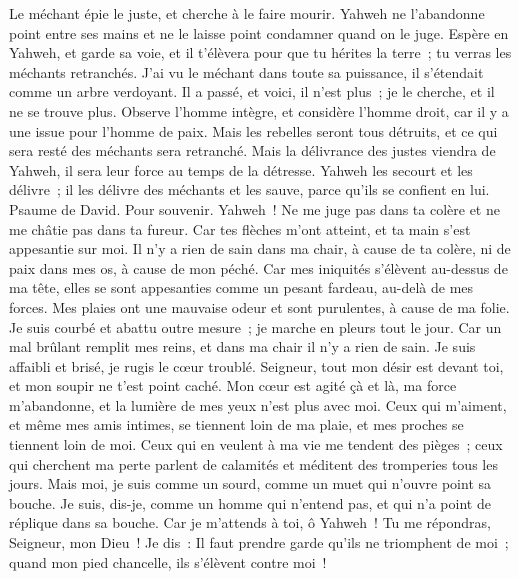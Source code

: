 \begin{multicols}{2}
 Le méchant épie le juste, et cherche à le faire mourir.
Yahweh ne l'abandonne point entre ses mains et ne le laisse point condamner quand on le juge.
 Espère en Yahweh, et garde sa voie, et il t'élèvera pour que tu hérites la terre~; tu verras les méchants retranchés.
 J'ai vu le méchant dans toute sa puissance, il s'étendait comme un arbre verdoyant.
Il a passé, et voici, il n'est plus~; je le cherche, et il ne se trouve plus.
 Observe l'homme intègre, et considère l'homme droit, car il y a une issue pour l'homme de paix.
Mais les rebelles seront tous détruits, et ce qui sera resté des méchants sera retranché.
 Mais la délivrance des justes viendra de Yahweh, il sera leur force au temps de la détresse.
Yahweh les secourt et les délivre~; il les délivre des méchants et les sauve, parce qu'ils se confient en lui.
\VerseOne{}Psaume de David. Pour souvenir.
Yahweh~! Ne me juge pas dans ta colère et ne me châtie pas dans ta fureur.
Car tes flèches m'ont atteint, et ta main s'est appesantie sur moi.
Il n'y a rien de sain dans ma chair, à cause de ta colère, ni de paix dans mes os, à cause de mon péché.
Car mes iniquités s'élèvent au-dessus de ma tête, elles se sont appesanties comme un pesant fardeau, au-delà de mes forces.
Mes plaies ont une mauvaise odeur et sont purulentes, à cause de ma folie.
Je suis courbé et abattu outre mesure~; je marche en pleurs tout le jour.
Car un mal brûlant remplit mes reins, et dans ma chair il n'y a rien de sain.
Je suis affaibli et brisé, je rugis le cœur troublé.
Seigneur, tout mon désir est devant toi, et mon soupir ne t'est point caché.
Mon cœur est agité çà et là, ma force m'abandonne, et la lumière de mes yeux n'est plus avec moi.
Ceux qui m'aiment, et même mes amis intimes, se tiennent loin de ma plaie, et mes proches se tiennent loin de moi.
Ceux qui en veulent à ma vie me tendent des pièges~; ceux qui cherchent ma perte parlent de calamités et méditent des tromperies tous les jours.
Mais moi, je suis comme un sourd, comme un muet qui n'ouvre point sa bouche.
Je suis, dis-je, comme un homme qui n'entend pas, et qui n'a point de réplique dans sa bouche.
Car je m'attends à toi, ô Yahweh~! Tu me répondras, Seigneur, mon Dieu~!
Je dis~: Il faut prendre garde qu'ils ne triomphent de moi~; quand mon pied chancelle, ils s'élèvent contre moi~!

\end{multicols}
